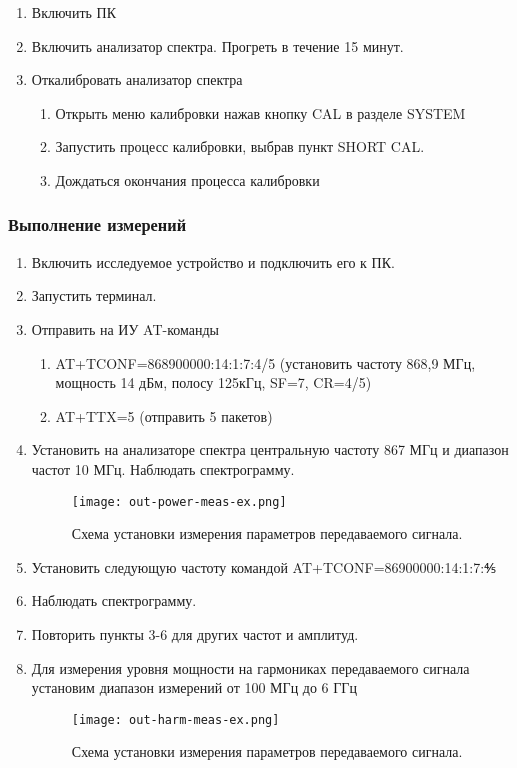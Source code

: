 \begin{enumerate}
	\setlength\itemsep{-1ex}
	\item Включить ПК 
	\item Включить анализатор спектра. Прогреть в течение 15 минут.
	\item Откалибровать анализатор спектра
	\begin{enumerate}
		\item Открыть меню калибровки нажав кнопку CAL в разделе SYSTEM
		\item Запустить процесс калибровки, выбрав пункт SHORT CAL.
		\item Дождаться окончания процесса калибровки
	\end{enumerate}
\end{enumerate}

\subsubsection{Выполнение измерений}

\begin{enumerate}
	\setlength\itemsep{-1ex}
	\item Включить исследуемое устройство и подключить его к ПК.
	\item Запустить терминал. 
	\item Отправить на ИУ AT-команды
		\begin{enumerate}
			\setlength\itemsep{-1ex}
			\item AT+TCONF=868900000:14:1:7:4/5 (установить частоту 868,9 МГц, мощность 14 дБм, полосу 125кГц, SF=7, CR=4/5)
			\item AT+TTX=5 (отправить 5 пакетов)
		\end{enumerate}
	\item Установить на анализаторе спектра центральную частоту 867 МГц и диапазон частот 10 МГц. Наблюдать спектрограмму.
		\begin{figure}[H]
			\centering
			\texttt{[image: out-power-meas-ex.png]}
			\caption{Схема установки измерения параметров передаваемого сигнала.}
			\label{fig:out-power-meas-ex}
		\end{figure}
	\item Установить следующую частоту командой AT+TCONF=86900000:14:1:7:⅘
	\item Наблюдать спектрограмму.
	\item Повторить пункты 3-6 для других частот и амплитуд.
	\item Для измерения уровня мощности на гармониках передаваемого сигнала установим диапазон измерений от 100 МГц до 6 ГГц
		\begin{figure}[H]
			\centering
			\texttt{[image: out-harm-meas-ex.png]}
			\caption{Схема установки измерения параметров передаваемого сигнала.}
			\label{fig:out-harm-meas-ex}
		\end{figure}	
\end{enumerate}

